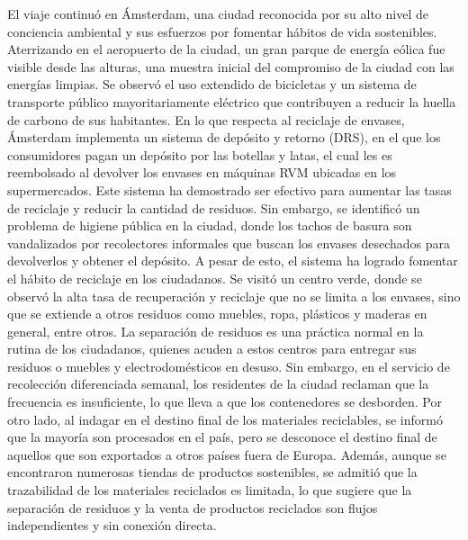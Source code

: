El viaje continuó en Ámsterdam, una ciudad reconocida por su alto nivel de conciencia ambiental y sus esfuerzos por fomentar hábitos de vida sostenibles. Aterrizando en el aeropuerto de la ciudad, un gran parque de energía eólica fue visible desde las alturas, una muestra inicial del compromiso de la ciudad con las energías limpias. Se observó el uso extendido de bicicletas y un sistema de transporte público mayoritariamente eléctrico que contribuyen a reducir la huella de carbono de sus habitantes. En lo que respecta al reciclaje de envases, Ámsterdam implementa un sistema de depósito y retorno (DRS), en el que los consumidores pagan un depósito por las botellas y latas, el cual les es reembolsado al devolver los envases en máquinas RVM ubicadas en los supermercados. Este sistema ha demostrado ser efectivo para aumentar las tasas de reciclaje y reducir la cantidad de residuos. Sin embargo, se identificó un problema de higiene pública en la ciudad, donde los tachos de basura son vandalizados por recolectores informales que buscan los envases desechados para devolverlos y obtener el depósito. A pesar de esto, el sistema ha logrado fomentar el hábito de reciclaje en los ciudadanos. Se visitó un centro verde, donde se observó la alta tasa de recuperación y reciclaje que no se limita a los envases, sino que se extiende a otros residuos como muebles, ropa, plásticos y maderas en general, entre otros. La separación de residuos es una práctica normal en la rutina de los ciudadanos, quienes acuden a estos centros para entregar sus residuos o muebles y electrodomésticos en desuso. Sin embargo, en el servicio de recolección diferenciada semanal, los residentes de la ciudad reclaman que la frecuencia es insuficiente, lo que lleva a que los contenedores se desborden. Por otro lado, al indagar en el destino final de los materiales reciclables, se informó que la mayoría son procesados en el país, pero se desconoce el destino final de aquellos que son exportados a otros países fuera de Europa. Además, aunque se encontraron numerosas tiendas de productos sostenibles, se admitió que la trazabilidad de los materiales reciclados es limitada, lo que sugiere que la separación de residuos y la venta de productos reciclados son flujos independientes y sin conexión directa.

